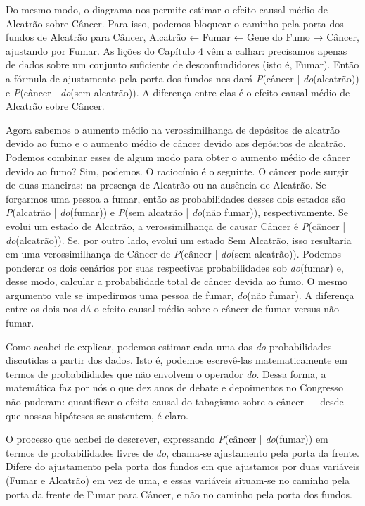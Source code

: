\documentclass[11pt,a5paper,twoside]{book}
\begin{document}
Do mesmo modo, o diagrama nos permite estimar o efeito causal médio de Alcatrão sobre Câncer. Para isso, podemos bloquear o caminho pela porta dos fundos de Alcatrão para Câncer, Alcatrão ← Fumar ← Gene do Fumo → Câncer, ajustando por Fumar. As lições do Capítulo 4 vêm a calhar: precisamos apenas de dados sobre um conjunto suficiente de desconfundidores (isto é, Fumar). Então a fórmula de ajustamento pela porta dos fundos nos dará \textit{P}(câncer | \textit{do}(alcatrão)) e \textit{P}(câncer | \textit{do}(sem alcatrão)). A diferença entre elas é o efeito causal médio de Alcatrão sobre Câncer.

Agora sabemos o aumento médio na verossimilhança de depósitos de alcatrão devido ao fumo e o aumento médio de câncer devido aos depósitos de alcatrão. Podemos combinar esses de algum modo para obter o aumento médio de câncer devido ao fumo? Sim, podemos. O raciocínio é o seguinte. O câncer pode surgir de duas maneiras: na presença de Alcatrão ou na ausência de Alcatrão. Se forçarmos uma pessoa a fumar, então as probabilidades desses dois estados são \textit{P}(alcatrão | \textit{do}(fumar)) e \textit{P}(sem alcatrão | \textit{do}(não fumar)), respectivamente. Se evolui um estado de Alcatrão, a verossimilhança de causar Câncer é \textit{P}(câncer | \textit{do}(alcatrão)). Se, por outro lado, evolui um estado Sem Alcatrão, isso resultaria em uma verossimilhança de Câncer de \textit{P}(câncer | \textit{do}(sem alcatrão)). Podemos ponderar os dois cenários por suas respectivas probabilidades sob \textit{do}(fumar) e, desse modo, calcular a probabilidade total de câncer devida ao fumo. O mesmo argumento vale se impedirmos uma pessoa de fumar, \textit{do}(não fumar). A diferença entre os dois nos dá o efeito causal médio sobre o câncer de fumar versus não fumar.

Como acabei de explicar, podemos estimar cada uma das \textit{do}-probabilidades discutidas a partir dos dados. Isto é, podemos escrevê-las matematicamente em termos de probabilidades que não envolvem o operador \textit{do}. Dessa forma, a matemática faz por nós o que dez anos de debate e depoimentos no Congresso não puderam: quantificar o efeito causal do tabagismo sobre o câncer — desde que nossas hipóteses se sustentem, é claro.

O processo que acabei de descrever, expressando \textit{P}(câncer | \textit{do}(fumar)) em termos de probabilidades livres de \textit{do}, chama-se ajustamento pela porta da frente. Difere do ajustamento pela porta dos fundos em que ajustamos por duas variáveis (Fumar e Alcatrão) em vez de uma, e essas variáveis situam-se no caminho pela porta da frente de Fumar para Câncer, e não no caminho pela porta dos fundos.
\end{document}
